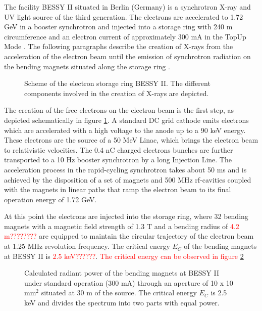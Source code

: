 The facility BESSY II situated in Berlin (Germany) is a synchrotron X-ray and UV light source of the third generation. The electrons are accelerated to 1.72 GeV in a booster synchrotron and injected into a storage ring with 240 m circumference and an electron current of approximately 300 mA in the TopUp Mode \citep{couprie_x_2008}. The following paragraphs describe the creation of X-rays from the acceleration of the electron beam until the emission of synchrotron radiation on the bending magnets situated along the storage ring \citep{bakker_orbit_1998, bakker_status_1999}.

\begin{figure}%
\centering
\def\svgwidth{0.7\linewidth}
{\figfont{9pt}}
\caption[Scheme of the electron storage ring BESSY II.]{Scheme of the electron storage ring BESSY II. The different components involved in the creation of X-rays are depicted.}
\label{fig:BessyScheme}
\end{figure}

The creation of the free electrons on the electron beam is the first step, as depicted schematically in figure \ref{fig:BessyScheme}. A standard DC grid cathode emits electrons which are accelerated with a high voltage to the anode up to a 90 keV energy. These electrons are the source of a 50 MeV Linac, which brings the electron beam to relativistic velocities. The 0.4 nC charged electrons bunches are further transported to a 10 Hz booster synchrotron by a long Injection Line. The acceleration process in the rapid-cycling synchrotron takes about 50 ms and is achieved by the disposition of a set of magnets and 500 MHz rf-cavities coupled with the magnets in linear paths that ramp the electron beam to its final operation energy of 1.72 GeV.

At this point the electrons are injected into the storage ring, where 32 bending magnets with a magnetic field strength of 1.3 T and a bending radius of \textcolor{red}{4.2 m????????} \citep{klein_elektronenspeicherringe_2014} are equipped to maintain the circular trajectory of the electron beam at 1.25 MHz revolution frequency. The critical energy $E_C$ of the bending magnets at BESSY II is \textcolor{red}{2.5 keV??????}. \textcolor{red}{The critical energy can be observed in figure \ref{fig:CriticalEnergy}}




\begin{figure}%
	\centering
		
		\caption[Radiant power of BESSY II.]{Calculated radiant power of the bending magnets at BESSY II under standard operation (300 mA) through an aperture of 10 x 10 mm$^2$ situated at 30 m of the source. The critical energy $E_C$ is 2.5 keV and divides the spectrum into two parts with equal power.}
		\label{fig:CriticalEnergy}
\end{figure}





